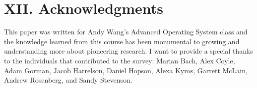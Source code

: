 \documentclass[letterpaper]{article}
\begin{document}
\section{XII. Acknowledgments}
This paper was written for Andy Wang's Advanced Operating System class and the knowledge learned from this course has been monumental to growing and understanding more about pioneering research. I want to provide a special thanks to the individuals that contributed to the survey: Marian Bach, Alex Coyle, Adam Gorman, Jacob Harrelson, Daniel Hopson, Alexa Kyros, Garrett McLain, Andrew Rosenberg, and Sandy Stevenson. 



\end{document}
